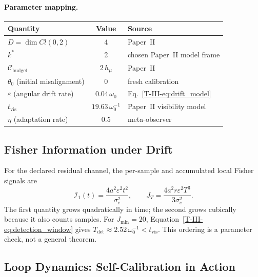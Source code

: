 \documentclass[12pt,a4paper,openany]{book}
\begin{document}
\paragraph{Parameter mapping.}
\begin{center}
\small
\begin{tabular}{@{}lcl@{}}
\toprule
\textbf{Quantity} & \textbf{Value} & \textbf{Source} \\
\midrule
$D = \dim Cl(0,2)$ & 4 & Paper~II \\
$k^*$ & 2 & chosen Paper~II model frame \\
$\mathcal{C}_{\mathrm{budget}}$ & $2\,h_\mu$ & Paper~II \\
$\theta_0$ (initial misalignment) & 0 & fresh calibration \\
$\varepsilon$ (angular drift rate) & $0.04\,\omega_0$
  & Eq.~\eqref{T-III-eq:drift_model} \\
$t_{\mathrm{vis}}$ & $19.63\,\omega_0^{-1}$
  & Paper~II visibility model \\
$\eta$ (adaptation rate) & $0.5$ & meta-observer \\
\bottomrule
\end{tabular}
\end{center}

\subsection{Fisher Information under Drift}
\label{T-III-subsec:fisher_drift}

For the declared residual channel, the per-sample and accumulated local
Fisher signals are
\begin{equation}
\label{T-III-eq:fisher_qubit}
\mathcal I_1(t)=\frac{4a^2\varepsilon^2t^2}{\sigma_e^2},
\qquad
J_T=\frac{4a^2r\varepsilon^2T^3}{3\sigma_e^2}.
\end{equation}
The first quantity grows quadratically in time; the second grows
cubically because it also counts samples.  For $J_{\min}=20$,
Equation~\eqref{T-III-eq:detection_window} gives
$T_{\mathrm{det}}\approx2.52\,\omega_0^{-1}<t_{\mathrm{vis}}$.
This ordering is a parameter check, not a general theorem.

\subsection{Loop Dynamics: Self-Calibration in Action}
\label{T-III-subsec:loop_dynamics}
\end{document}
